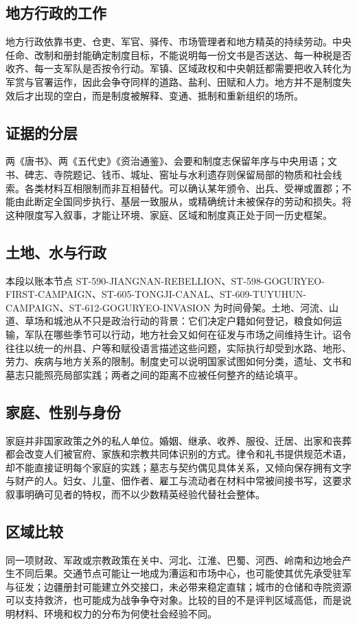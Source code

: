 \subsection{地方行政的工作}
地方行政依靠书吏、仓吏、军官、驿传、市场管理者和地方精英的持续劳动。中央任命、改制和册封能确定制度目标，不能说明每一份文书是否送达、每一种税是否收齐、每一支军队是否按令行动。军镇、区域政权和中央朝廷都需要把收入转化为军赏与官署运作，因此会争夺同样的道路、盐利、田赋和人力。地方并不是制度失效后才出现的空白，而是制度被解释、变通、抵制和重新组织的场所。

\subsection{证据的分层}
两《唐书》、两《五代史》《资治通鉴》、会要和制度志保留年序与中央用语；文书、碑志、寺院题记、钱币、城址、窑址与水利遗存则保留局部的物质和社会线索。各类材料互相限制而非互相替代。可以确认某年颁令、出兵、受禅或置郡；不能由此断定全国同步执行、基层一致服从，或精确统计未被保存的劳动和损失。将这种限度写入叙事，才能让环境、家庭、区域和制度真正处于同一历史框架。
\subsection{土地、水与行政}
本段以账本节点 ST-590-JIANGNAN-REBELLION、ST-598-GOGURYEO-FIRST-CAMPAIGN、ST-605-TONGJI-CANAL、ST-609-TUYUHUN-CAMPAIGN、ST-612-GOGURYEO-INVASION 为时间骨架。土地、河流、山道、草场和城池从不只是政治行动的背景：它们决定户籍如何登记，粮食如何运输，军队在哪些季节可以行动，地方社会又如何在征发与市场之间维持生计。诏令往往以统一的州县、户等和赋役语言描述这些问题，实际执行却受到水路、地形、劳力、疾病与地方关系的限制。制度史可以说明国家试图如何分类，遗址、文书和墓志只能照亮局部实践；两者之间的距离不应被任何整齐的结论填平。

\subsection{家庭、性别与身份}
家庭并非国家政策之外的私人单位。婚姻、继承、收养、服役、迁居、出家和丧葬都会改变人们被官府、家族和宗教共同体识别的方式。律令和礼书提供规范术语，却不能直接证明每个家庭的实践；墓志与契约偶见具体关系，又倾向保存拥有文字与财产的人。妇女、儿童、佃作者、雇工与流动者在材料中常被间接书写，这要求叙事明确可见者的特权，而不以少数精英经验代替社会整体。

\subsection{区域比较}
同一项财政、军政或宗教政策在关中、河北、江淮、巴蜀、河西、岭南和边地会产生不同后果。交通节点可能让一地成为漕运和市场中心，也可能使其优先承受驻军与征发；边疆册封可能建立外交接口，未必带来稳定直辖；城市的仓储和寺院资源可以支持救济，也可能成为战争争夺对象。比较的目的不是评判区域高低，而是说明材料、环境和权力的分布为何使社会经验不同。

